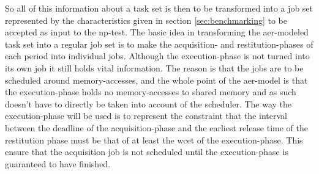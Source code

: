 \documentclass{kththesis}
\begin{document}
So all of this information about a task set is then to be transformed into a job set represented by
the characteristics given in section \ref{sec:benchmarking} to be accepted as input to the
\acrshort{np}-test. The basic idea in transforming the \acrshort{aer}-modeled task set into a
regular job set is to make the acquisition- and restitution-phases of each period into individual
jobs. Although the execution-phase is not turned into its own job it still holds vital information.
The reason is that the jobs are to be scheduled around memory-accesses, and the whole point of the
\acrshort{aer}-model is that the execution-phase holds no memory-accesses to shared memory and as
such doesn't have to directly be taken into account of the scheduler. The way the execution-phase
will be used is to represent the constraint that the interval between the deadline of the
acquisition-phase and the earliest release time of the restitution phase must be that of at least
the \acrshort{wcet} of the execution-phase. This ensure that the acquisition job is not scheduled
until the execution-phase is guaranteed to have finished. 
\end{document}
